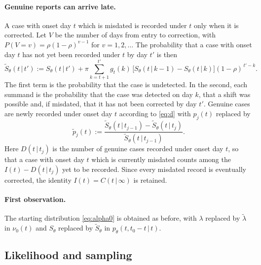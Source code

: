 \documentclass[11pt,a4paper]{article}
\newcommand{\given}{\,|\,}
\begin{document}
\paragraph{Genuine reports can arrive late.} A case with onset day $t$ which is
misdated is recorded under $t$ only when it is corrected. Let $V$ be the number
of days from entry to correction, with $P(V=v)=\rho(1-\rho)^{v-1}$ for
$v=1,2,\dots$ The probability that a case with onset day $t$ has not yet been
recorded under $t$ by day $t'$ is then
\begin{equation}\label{eq:Stilde}
\tilde S_\theta(t\given t') := S_\theta(t\given t')
+ \pi\sum_{k=t+1}^{t'}g_t(k)\,\bigl[S_\theta(t\given k-1)-S_\theta(t\given k)\bigr](1-\rho)^{\,t'-k}.
\end{equation}
The first term is the probability that the case is undetected. In the second,
each summand is the probability that the case was detected on day $k$, that a
shift was possible and, if misdated, that it has not been corrected by day
$t'$. Genuine cases are newly recorded
under onset day $t$ according to \eqref{eq:d} with $p_j(t)$ replaced by
\begin{equation}\label{eq:ptilde}
\tilde p_j(t) := \frac{\tilde S_\theta(t\given t_{j-1})-\tilde S_\theta(t\given t_j)}
{\tilde S_\theta(t\given t_{j-1})}.
\end{equation}
Here $D(t\given t_j)$ is the number of genuine cases recorded under onset day
$t$, so that a case with onset day $t$ which is currently misdated counts among
the $I(t)-D(t\given t_j)$ yet to be recorded. Since every misdated record is
eventually corrected, the identity $I(t)=C(t\given\infty)$ is retained.

\paragraph{First observation.} The starting distribution \eqref{eq:alpha0} is
obtained as before, with $\lambda$ replaced by $\tilde\lambda$ in
$\nu_0(t)$ and $S_\theta$ replaced by $\tilde S_\theta$ in
$p_\theta(t,t_0-t\given t)$.

\subsection{Likelihood and sampling}
\end{document}
